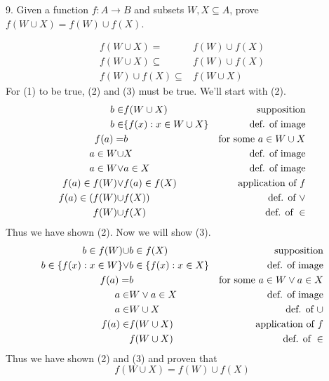 \documentclass{idrisMemo}
\begin{document}
\begin{prooflist}{9. Given a function $f: A \rightarrow B$ and subsets $W, X
    \subseteq A$, prove $f(W \cup X)=f(W) \cup f(X)$.}
\item \imagedef{}
\setcounter{equation}{0}
\begin{align}
    f(W \cup X)=&f(W) \cup f(X)\\
    f(W \cup X)\subseteq& f(W) \cup f(X) \\
    f(W) \cup f(X) \subseteq& f(W \cup X)
\end{align}
For (1) to be true, (2) and (3) must be true. We'll start with (2).
\begin{align}
    b\in& f(W\cup X) &\text{supposition}\\
    b\in& \{f(x): x \in W\cup X\} &\text{def. of image}\\
    f(a) =& b & \text{for some }a\in W\cup X\\
    a \in W \cup& X &\text{def. of image}\\
    a \in W \lor & a \in X &\text{def. of image}\\
    f(a) \in f(W) \lor& f(a) \in f(X)&\text{application of }f\\
    f(a) \in (f(W) \cup& f(X)) &\text{def. of }\lor\\
    f(W) \cup& f(X)&\text{def. of }\in
\end{align}
Thus we have shown (2). Now we will show (3).
\begin{align}
    b\in f(W)\cup& b\in f(X) &\text{supposition}\\
    b\in \{f(x): x \in W\} \lor& b\in \{f(x): x \in X\}&\text{def. of image}\\
    f(a) =& b & \text{for some }a\in W\lor a\in X\\
    a \in& W \lor a \in X &\text{def. of image}\\
    a \in& W \cup X &\text{def. of }\cup\\
    f(a) \in& f(W\cup X)&\text{application of }f\\
            &f(W\cup X)&\text{def. of }\in
\end{align}
Thus we have shown (2) and (3) and proven that
\[
    f(W \cup X)=f(W) \cup f(X)
\]
\end{prooflist}
\end{document}
